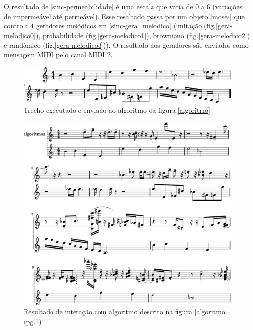 \documentclass{ppgmus}
\begin{document}
O resultado de [sinc-permeabilidade] é uma escala que varia de 0 a 6 (variações de impermeável até permeável).
Esse resultado passa por um objeto [moses] que controla 4 geradores melódicos em [sinc-gera\_melodico]
(imitação (fig.\ref{gera-melodico0}), probabilidade (fig.\ref{gera-melodico1}), browniano (fig.\ref{gera-melodico2}) 
e randômico (fig.\ref{gera-melodico3})). O resultado dos geradores são enviados como mensagem MIDI pelo canal MIDI 2.

\begin{figure}
\includegraphics[scale=.5]{base-duo}
\caption{Trecho executado e enviado ao algoritmo da figura \ref{algoritmo} }
\label{base-duo}
\end{figure}



\begin{figure}
\includegraphics[scale=.5]{alg-interativos}
\caption{Resultado de interação com algoritmo descrito na figura \ref{algoritmo} (pg.1)}
\label{alg-interativos}
\end{figure}
\end{document}
